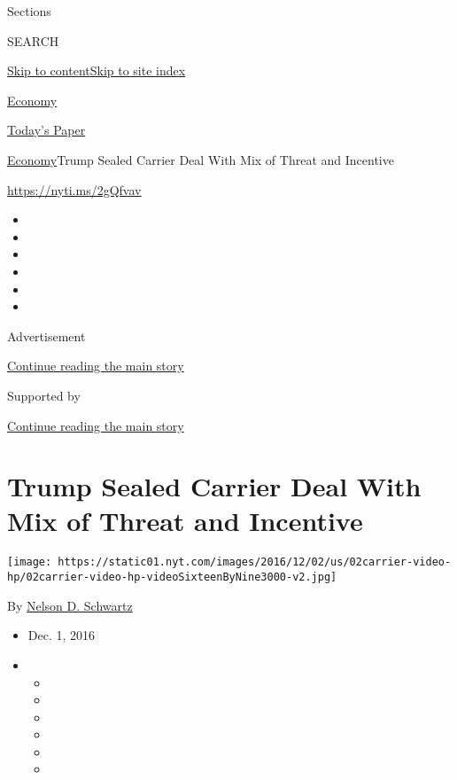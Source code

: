 Sections

SEARCH

\protect\hyperlink{site-content}{Skip to
content}\protect\hyperlink{site-index}{Skip to site index}

\href{https://www.nytimes.com/section/business/economy}{Economy}

\href{https://myaccount.nytimes.com/auth/login?response_type=cookie\&client_id=vi}{}

\href{https://www.nytimes.com/section/todayspaper}{Today's Paper}

\href{/section/business/economy}{Economy}\textbar{}Trump Sealed Carrier
Deal With Mix of Threat and Incentive

\url{https://nyti.ms/2gQfvav}

\begin{itemize}
\item
\item
\item
\item
\item
\item
\end{itemize}

Advertisement

\protect\hyperlink{after-top}{Continue reading the main story}

Supported by

\protect\hyperlink{after-sponsor}{Continue reading the main story}

\hypertarget{trump-sealed-carrier-deal-with-mix-of-threat-and-incentive}{%
\section{Trump Sealed Carrier Deal With Mix of Threat and
Incentive}\label{trump-sealed-carrier-deal-with-mix-of-threat-and-incentive}}

\texttt{[image: https://static01.nyt.com/images/2016/12/02/us/02carrier-video-hp/02carrier-video-hp-videoSixteenByNine3000-v2.jpg]}

By \href{http://www.nytimes.com/by/nelson-d-schwartz}{Nelson D.
Schwartz}

\begin{itemize}
\item
  Dec. 1, 2016
\item
  \begin{itemize}
  \item
  \item
  \item
  \item
  \item
  \item
  \end{itemize}
\end{itemize}

